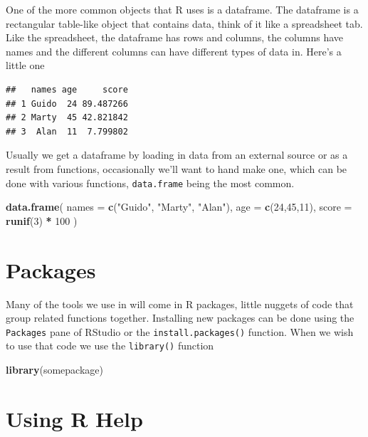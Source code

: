 \documentclass[
]{book}
\newenvironment{Shaded}{\begin{snugshade}}{\end{snugshade}}
\newcommand{\DataTypeTok}[1]{\textcolor[rgb]{0.13,0.29,0.53}{#1}}
\newcommand{\DecValTok}[1]{\textcolor[rgb]{0.00,0.00,0.81}{#1}}
\newcommand{\KeywordTok}[1]{\textcolor[rgb]{0.13,0.29,0.53}{\textbf{#1}}}
\newcommand{\NormalTok}[1]{#1}
\newcommand{\OperatorTok}[1]{\textcolor[rgb]{0.81,0.36,0.00}{\textbf{#1}}}
\newcommand{\StringTok}[1]{\textcolor[rgb]{0.31,0.60,0.02}{#1}}
\begin{document}
One of the more common objects that R uses is a dataframe. The dataframe is a rectangular table-like object that contains data, think of it like a spreadsheet tab. Like the spreadsheet, the dataframe has rows and columns, the columns have names and the different columns can have different types of data in. Here's a little one

\begin{verbatim}
##   names age     score
## 1 Guido  24 89.487266
## 2 Marty  45 42.821842
## 3  Alan  11  7.799802
\end{verbatim}

Usually we get a dataframe by loading in data from an external source or as a result from functions, occasionally we'll want to hand make one, which can be done with various functions, \texttt{data.frame} being the most common.

\begin{Shaded}
\begin{Highlighting}[]
\KeywordTok{data.frame}\NormalTok{(}
  \DataTypeTok{names =} \KeywordTok{c}\NormalTok{(}\StringTok{"Guido"}\NormalTok{, }\StringTok{"Marty"}\NormalTok{, }\StringTok{"Alan"}\NormalTok{),}
  \DataTypeTok{age =} \KeywordTok{c}\NormalTok{(}\DecValTok{24}\NormalTok{,}\DecValTok{45}\NormalTok{,}\DecValTok{11}\NormalTok{),}
  \DataTypeTok{score =} \KeywordTok{runif}\NormalTok{(}\DecValTok{3}\NormalTok{) }\OperatorTok{*}\StringTok{ }\DecValTok{100}
\NormalTok{)}
\end{Highlighting}
\end{Shaded}

\hypertarget{packages}{%
\section{Packages}\label{packages}}

Many of the tools we use in will come in R packages, little nuggets of code that group related functions together. Installing new packages can be done using the \texttt{Packages} pane of RStudio or the \texttt{install.packages()} function. When we wish to use that code we use the \texttt{library()} function

\begin{Shaded}
\begin{Highlighting}[]
\KeywordTok{library}\NormalTok{(somepackage)}
\end{Highlighting}
\end{Shaded}

\hypertarget{using-r-help}{%
\section{Using R Help}\label{using-r-help}}
\end{document}
